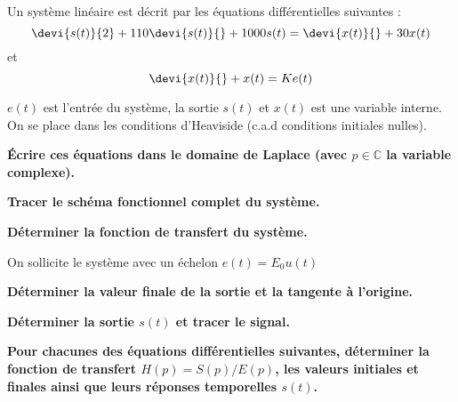 Un système linéaire est décrit par les équations différentielles suivantes :
$$
\devi{s(t)}{2} + 110 \devi{s(t)}{} + 1000 s(t) = \devi{x(t)}{} + 30 x(t)
$$
et 
$$
\devi{x(t)}{} + x(t) = K e(t) 
$$

$e(t)$ est l'entrée du système, la sortie $s(t)$ et $x(t)$ est une variable
interne. On se place dans les conditions d'Heaviside (c.a.d conditions 
initiales nulles).\newline

\question{}
\textbf{\'Ecrire ces équations dans le domaine de Laplace (avec 
$p\in\mathbb{C}$ la variable complexe).}

\question{}
\textbf{Tracer le schéma fonctionnel complet du système.}

\question{}
\textbf{Déterminer la fonction de transfert du système.}
\newline

On sollicite le système avec un échelon $e(t)=E_0 u(t)$

\question{}
\textbf{Déterminer la valeur finale de la sortie et la tangente à l'origine.}

\question{}
\textbf{Déterminer la sortie $s(t)$ et tracer le signal.}


\question{}
\textbf{Pour chacunes des équations différentielles suivantes, 
déterminer la fonction de transfert $H(p) = S(p)/E(p)$, les valeurs initiales
et finales ainsi que leurs réponses temporelles $s(t)$.}

